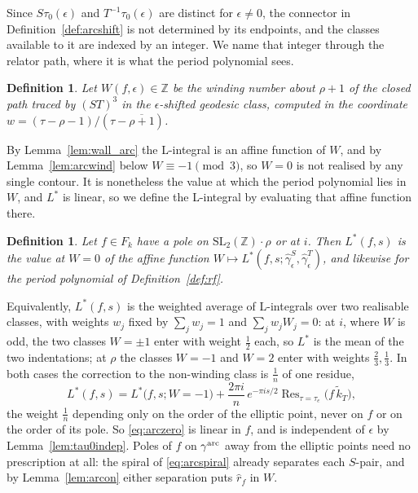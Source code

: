 \documentclass[11pt]{article}
\newtheorem{definition}[theorem]{Definition}
\newcommand{\ZZ}{\mathbb{Z}}
\newcommand{\SLZ}{\mathrm{SL}_2(\ZZ)}
\newcommand{\tk}{\widetilde{k}_T}
\DeclareMathOperator{\Res}{Res}
\begin{document}
Since $S\tau_0(\epsilon)$ and $T^{-1}\tau_0(\epsilon)$ are distinct for $\epsilon\ne0$, the
connector in Definition~\ref{def:arcshift} is not determined by its endpoints, and the classes
available to it are indexed by an integer. We name that integer through the relator path, where it
is what the period polynomial sees.

\begin{definition}\label{def:arcwind}
Let $W(f,\epsilon)\in\ZZ$ be the winding number about $\rho+1$ of the closed path traced by
$(ST)^3$ in the $\epsilon$-shifted geodesic class, computed in the coordinate
$w=(\tau-\rho-1)/(\tau-\overline{\rho+1})$.
\end{definition}

By Lemma~\ref{lem:wall_arc} the L-integral is an affine function of $W$, and by
Lemma~\ref{lem:arcwind} below $W\equiv-1\pmod 3$, so $W=0$ is not realised by any single
contour. It is nonetheless the value at which the period polynomial lies in $W$, and $L^*$ is
linear, so we define the L-integral by evaluating that affine function there.

\begin{definition}\label{def:arczero}
Let $f\in F_k$ have a pole on $\SLZ\!\cdot\!\rho$ or at $i$. Then $L^*(f,s)$ is the value at
$W=0$ of the affine function $W\mapsto L^*(f,s;\hat\gamma^S_\epsilon,\hat\gamma^T_\epsilon)$, and
likewise for the period polynomial of Definition~\ref{def:rf}.
\end{definition}

Equivalently, $L^*(f,s)$ is the weighted average of L-integrals over two realisable classes, with
weights $w_j$ fixed by $\sum_jw_j=1$ and $\sum_jw_jW_j=0$: at $i$, where $W$ is odd, the two
classes $W=\pm1$ enter with weight $\tfrac12$ each, so $L^*$ is the mean of the two indentations;
at $\rho$ the classes $W=-1$ and $W=2$ enter with weights $\tfrac23,\tfrac13$. In both cases the
correction to the non-winding class is $\tfrac1n$ of one residue,
\begin{equation}\label{eq:arczero}
L^*(f,s)=L^*\big(f,s;W=-1\big)+\frac{2\pi i}{n}\,e^{-\pi is/2}\Res_{\tau=\tau_e}\!\big(f\,\tk\big),
\end{equation}
the weight $\tfrac1n$ depending only on the order of the elliptic point, never on $f$ or on the
order of its pole. So \eqref{eq:arczero} is linear in $f$, and is independent of $\epsilon$ by
Lemma~\ref{lem:tau0indep}. Poles of $f$ on $\gamma^{\rm arc}$ away from the elliptic points need
no prescription at all: the spiral of \eqref{eq:arcspiral} already separates each $S$-pair, and by
Lemma~\ref{lem:arcon} either separation puts $\hat r_f$ in $W$.
\end{document}
